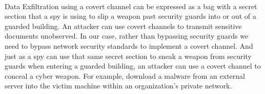 \documentclass[main.tex]{subfiles}
\begin{document}
\paragraph{}
Data Exfiltration using a covert channel can be expressed as a bag with a secret section that a spy is using to slip a weapon past security guards into or out of a guarded building. An attacker can use covert channels to transmit sensitive documents unobserved. In our case, rather than bypassing security guards we need to bypass network security standards to implement a covert channel. And just as a spy can use that same secret section to sneak a weapon from security guards when entering a guarded building, an attacker can use a covert channel to conceal a cyber weapon. For example, download a malware from an external server into the victim machine within an organization's private network.
\end{document}
